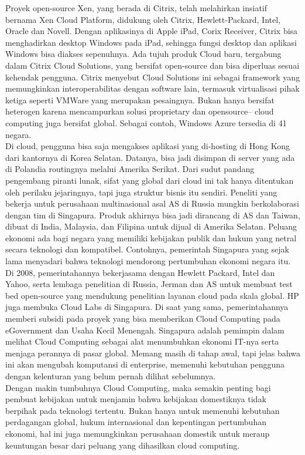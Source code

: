 \tab Proyek open-source Xen, yang berada di Citrix, telah melahirkan insiatif bernama Xen Cloud Platform, didukung oleh Citrix, Hewlett-Packard, Intel, Oracle dan Novell. Dengan aplikasinya di Apple iPad, Corix Receiver, Citrix bisa menghadirkan desktop Windows pada iPad, sehingga fungsi desktop dan aplikasi Windows bisa diakses sepenuhnya. Ada tujuh produk Cloud baru, tergabung dalam Citrix Cloud Solutions, yang bersifat open-source dan bisa diperluas sesuai kehendak pengguna. Citrix menyebut Cloud Solutions ini sebagai framework yang memungkinkan interoperabilitas dengan software lain, termasuk virtualisasi pihak ketiga seperti VMWare yang merupakan pesaingnya. Bukan hanya bersifat heterogen karena mencampurkan solusi proprietary dan opensource-- cloud computing juga bersifat global. Sebagai contoh, Windows Azure tersedia di 41 negara. \\Di cloud, pengguna bisa saja mengakses aplikasi yang di-hosting di Hong Kong dari kantornya di Korea Selatan. Datanya, bisa jadi disimpan di server yang ada di Polandia routingnya melalui Amerika Serikat. Dari sudut pandang pengembang piranti lunak, sifat yang global dari cloud ini tak hanya ditentukan oleh perilaku jejaringnya, tapi juga struktur bisnis itu sendiri. Peneliti yang bekerja untuk perusahaan multinasional asal AS di Russia mungkin berkolaborasi dengan tim di Singapura. Produk akhirnya bisa jadi dirancang di AS dan Taiwan, dibuat di India, Malaysia, dan Filipina untuk dijual di Amerika Selatan. Peluang ekonomi ada bagi negara yang memiliki kebijakan publik dan hukum yang netral secara teknologi dan kompatibel. Contohnya, pemerintah Singapura yang sejak lama menyadari bahwa teknologi mendorong pertumbuhan ekonomi negara itu. Di 2008, pemerintahannya bekerjasama dengan Hewlett Packard, Intel dan Yahoo, serta lembaga penelitian di Russia, Jerman dan AS untuk membuat test bed open-source yang mendukung penelitian layanan cloud pada skala global. HP juga membuka Cloud Labs di Singapura. Di saat yang sama, pemerintahannya memberi subsidi pada proyek yang bisa memberikan Cloud Computing pada eGovernment dan Usaha Kecil Menengah. Singapura adalah pemimpin dalam melihat Cloud Computing sebagai alat menumbuhkan ekonomi IT-nya serta menjaga perannya di pasar global. Memang masih di tahap awal, tapi jelas bahwa ini akan mengubah komputansi di enterprise, memenuhi kebutuhan pengguna dengan kelenturan yang belum pernah dilihat sebelumnya. \\Dengan makin tumbuhnya Cloud Computing, maka semakin penting bagi pembuat kebijakan untuk menjamin bahwa kebijakan domestiknya tidak berpihak pada teknologi tertentu. Bukan hanya untuk memenuhi kebutuhan perdagangan global, hukum internasional dan kepentingan pertumbuhan ekonomi, hal ini juga memungkinkan perusahaan domestik untuk meraup keuntungan besar dari peluang yang dihasilkan cloud computing.
